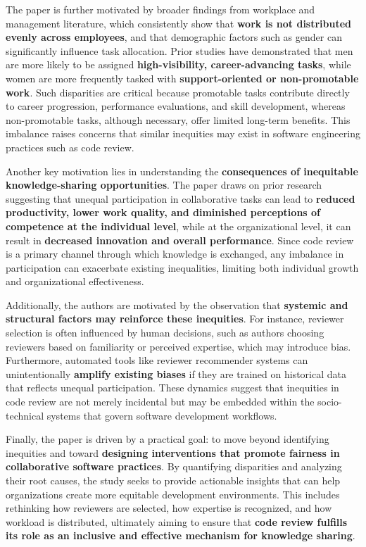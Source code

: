 The paper is further motivated by broader findings from workplace and management literature, which consistently show that \textbf{work is not distributed evenly across employees}, and that demographic factors such as gender can significantly influence task allocation. Prior studies have demonstrated that men are more likely to be assigned \textbf{high-visibility, career-advancing tasks}, while women are more frequently tasked with \textbf{support-oriented or non-promotable work}. Such disparities are critical because promotable tasks contribute directly to career progression, performance evaluations, and skill development, whereas non-promotable tasks, although necessary, offer limited long-term benefits. This imbalance raises concerns that similar inequities may exist in software engineering practices such as code review.

Another key motivation lies in understanding the \textbf{consequences of inequitable knowledge-sharing opportunities}. The paper draws on prior research suggesting that unequal participation in collaborative tasks can lead to \textbf{reduced productivity, lower work quality, and diminished perceptions of competence at the individual level}, while at the organizational level, it can result in \textbf{decreased innovation and overall performance}. Since code review is a primary channel through which knowledge is exchanged, any imbalance in participation can exacerbate existing inequalities, limiting both individual growth and organizational effectiveness.

Additionally, the authors are motivated by the observation that \textbf{systemic and structural factors may reinforce these inequities}. For instance, reviewer selection is often influenced by human decisions, such as authors choosing reviewers based on familiarity or perceived expertise, which may introduce bias. Furthermore, automated tools like reviewer recommender systems can unintentionally \textbf{amplify existing biases} if they are trained on historical data that reflects unequal participation. These dynamics suggest that inequities in code review are not merely incidental but may be embedded within the socio-technical systems that govern software development workflows.

Finally, the paper is driven by a practical goal: to move beyond identifying inequities and toward \textbf{designing interventions that promote fairness in collaborative software practices}. By quantifying disparities and analyzing their root causes, the study seeks to provide actionable insights that can help organizations create more equitable development environments. This includes rethinking how reviewers are selected, how expertise is recognized, and how workload is distributed, ultimately aiming to ensure that \textbf{code review fulfills its role as an inclusive and effective mechanism for knowledge sharing}.

